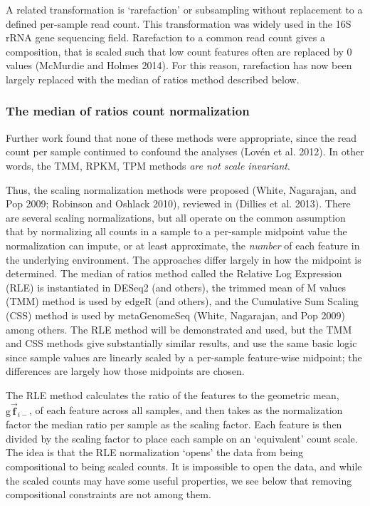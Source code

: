 \documentclass[onecolumn]{article}
\newcommand{\vect}[1]{\vec{\textbf{#1}}}
\begin{document}
A related transformation is `rarefaction' or subsampling without replacement to a defined per-sample read count. This transformation was widely used in the 16S rRNA gene sequencing field. Rarefaction to a common read count gives a composition, that is scaled such that low count features often are replaced by 0 values (McMurdie and Holmes 2014). For this reason, rarefaction has now been largely replaced with the median of ratios method described below.

\hypertarget{the-median-of-ratios-count-normalization}{%
\subsubsection{The median of ratios count normalization}\label{the-median-of-ratios-count-normalization}}

Further work found that none of these methods were appropriate, since the read count per sample continued to confound the analyses (Lovén et al. 2012). In other words, the TMM, RPKM, TPM methods \emph{are not scale invariant}.

Thus, the scaling normalization methods were proposed (White, Nagarajan, and Pop 2009; Robinson and Oshlack 2010), reviewed in (Dillies et al. 2013). There are several scaling normalizations, but all operate on the common assumption that by normalizing all counts in a sample to a per-sample midpoint value the normalization can impute, or at least approximate, the \emph{number} of each feature in the underlying environment. The approaches differ largely in how the midpoint is determined. The median of ratios method called the Relative Log Expression (RLE) is instantiated in DESeq2 (and others), the trimmed mean of M values (TMM) method is used by edgeR (and others), and the Cumulative Sum Scaling (CSS) method is used by metaGenomeSeq (White, Nagarajan, and Pop 2009) among others. The RLE method will be demonstrated and used, but the TMM and CSS methods give substantially similar results, and use the same basic logic since sample values are linearly scaled by a per-sample feature-wise midpoint; the differences are largely how those midpoints are chosen.

The RLE method calculates the ratio of the features to the geometric mean, \(\mathrm{g}\vect{f}_{i-}\), of each feature across all samples, and then takes as the normalization factor the median ratio per sample as the scaling factor. Each feature is then divided by the scaling factor to place each sample on an `equivalent' count scale. The idea is that the RLE normalization `opens' the data from being compositional to being scaled counts. It is impossible to open the data, and while the scaled counts may have some useful properties, we see below that removing compositional constraints are not among them.
\end{document}
